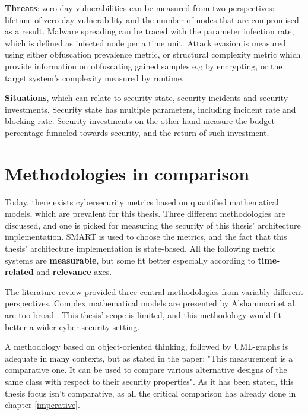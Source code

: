\textbf{Threats}: zero-day vulnerabilities can be measured from two
perspectives: lifetime of zero-day vulnerability and the number of
nodes that are compromised as a result. Malware spreading can be
traced with the parameter infection rate, which is defined as infected
node per a time unit. Attack evasion is measured using either
obfuscation prevalence metric, or structural complexity metric which
provide information on obfuscating gained samples e.g by encrypting,
or the target system's complexity measured by
runtime. \cite{pendleton2016survey ramos2017model}

\textbf{Situations}, which can relate to security state, security
incidents and security investments. Security state has multiple
parameters, including incident rate and blocking rate. Security
investments on the other hand measure the budget percentage funneled
towards security, and the return of such
investment. \cite{pendleton2016survey}

\section{Methodologies in comparison} \label{whyqueries}

Today, there exists cybersecurity metrics based on quantified
mathematical models, which are prevalent for this thesis. Three
different methodologies are discussed, and one is picked for measuring
the security of this thesis' architecture implementation. SMART is
used to choose the metrics, and the fact that this thesis'
architecture implementation is state-based. All the following metric
systems are \textbf{measurable}, but some fit better especially
according to \textbf{time-related} and \textbf{relevance} axes.

The literature review provided three central methodologies from
variably different perspectives. Complex mathematical models are
presented by Alshammari et al. are too broad
\cite{alshammari2009security}. This thesis' scope is limited, and this
methodology would fit better a wider cyber security setting.

A methodology based on object-oriented thinking, followed by
UML-graphs is adequate in many contexts, but as stated in the paper:
"This measurement is a comparative one. It can be used to compare
various alternative designs of the same class with respect to their
security properties". As it has been stated, this thesis focus isn't
comparative, as all the critical comparison has already done in
chapter \ref{imperative}.

